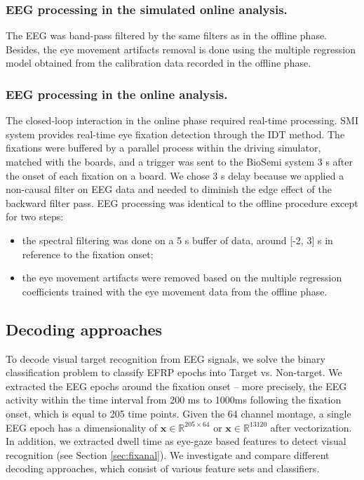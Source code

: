 \documentclass[12pt]{iopart}
\begin{document}
\subsubsection*{EEG processing in the simulated online analysis.}
The EEG was  band-pass filtered by the same filters as in the offline phase. Besides, the eye movement artifacts removal is done using the multiple regression model obtained from the calibration data recorded in the offline phase.

\subsubsection*{EEG processing in the online analysis.}
The closed-loop interaction in the online phase required real-time processing.
SMI system provides
real-time eye fixation detection through the IDT method. The fixations were buffered
by a parallel process within the driving simulator, matched with the boards,
and a trigger was sent to the BioSemi system 3 s after the onset of each fixation
on a board. We chose 3 s delay because we applied a non-causal filter on EEG data
and needed to diminish the edge effect of the backward filter pass.
EEG processing  was identical to the offline procedure
except for two steps:
\begin{itemize}
    \item the spectral filtering was done on a 5 s buffer of data,
        around [-2, 3] s in reference to the fixation onset;
    \item the eye movement artifacts were removed based on the multiple
        regression coefficients trained with the eye movement data from the offline phase.
\end{itemize}

\subsection{Decoding approaches}
To decode visual target recognition from EEG signals,
we solve the binary classification problem to classify EFRP epochs
into Target vs. Non-target. We extracted the EEG epochs
around the fixation onset -- more precisely, the EEG activity within the time interval from
200 ms to 1000ms following the fixation onset, which is equal to 205 time points.
Given the 64 channel montage, a single EEG epoch has a dimensionality of 
$\mathbf{x} \in \mathbb{R}^{205 \times 64}$ or
$\mathbf{x} \in \mathbb{R}^{13120}$ after vectorization.
In addition, we extracted dwell time as eye-gaze based features to detect
visual recognition (see Section \ref{sec:fixanal}).
We investigate and compare different decoding approaches, which consist of 
various feature sets and classifiers.
\end{document}
